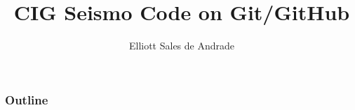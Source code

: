 \documentclass{beamer}
\author{Elliott Sales de Andrade}
\title{CIG Seismo Code on Git/GitHub}
\institute{University of Toronto}
\begin{document}
\begin{frame}
 \titlepage
\end{frame}

\begin{frame}
 \frametitle{Outline}
 \tableofcontents
\end{frame}










\end{document}
